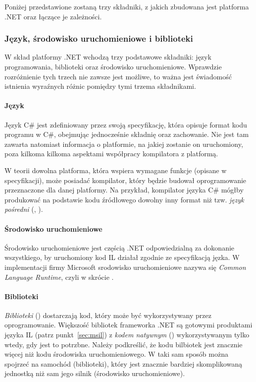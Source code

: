 Poniżej przedstawione zostaną trzy składniki, z jakich zbudowana jest platforma .NET oraz łączące je zależności.

\subsubsection{Język, środowisko uruchomieniowe i biblioteki}
W skład platformy .NET wchodzą trzy podstawowe składniki: język programowania, biblioteki oraz środowisko uruchomieniowe. Wprawdzie rozróżnienie tych trzech nie zawsze jest możliwe, to ważna jest świadomość istnienia wyraźnych różnic pomiędzy tymi trzema składnikami.

\paragraph{Język}
Język C\# jest zdefiniowany przez swoją specyfikację, która opisuje format kodu programu w C\#, obejmując jednocześnie składnię oraz zachowanie. Nie jest tam zawarta natomiast informacja o platformie, na jakiej zostanie on uruchomiony, poza kilkoma kilkoma aspektami współpracy kompilatora z platformą. 

W teorii dowolna platforma, która wspiera wymagane funkcje (opisane w specyfikacji), może posiadać kompilator, który będzie budował oprogramowanie przeznaczone dla danej platformy.  Na przykład, kompilator języka C\# mógłby produkować na podstawie kodu źródłowego dowolny inny format niż tzw. \emph{język pośredni} (, ).

\paragraph{Środowisko uruchomieniowe}
Środowisko uruchomieniowe jest częścią .NET odpowiedzialną za dokonanie wszystkiego, by uruchomiony kod IL działał zgodnie ze specyfikacją jęzka. W implementacji firmy Microsoft srodowisko uruchomieniowe nazywa się \emph{Common Language Runtime}, czyli w skrócie .

\paragraph{Biblioteki}
\emph{Biblioteki} () dostarczają kod, który może być wykorzystywany przez oprogramowanie. Większość bibliotek frameworka .NET są gotowymi produktami języka IL (patrz punkt~\ref{sec:msil}) z \emph{kodem natywnym} () wykorzystywanym tylko wtedy, gdy jest to potrzbne. Należy podkreślić, że kodu bilbiotek jest znacznie więcej niż kodu środowiska uruchomieniowego. W taki sam sposób można spojrzeć na samochód (biblioteki), który jest znacznie bardziej skomplikowaną jednostką niż sam jego silnik (środowisko uruchomieniowe).


